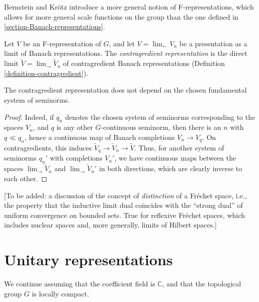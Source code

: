 \begin{remark}
\label{remark-generalscalefunctions}
 Bernstein and Kr\"otz introduce a more general notion of F-representations, which allows for more general scale functions on the group than the one defined in \ref{section-Banach-representations}.
\end{remark}

\begin{definition}
 \label{definition-contragredient-F}
Let $V$ be an F-representation of $G$, and let $V= \lim_\leftarrow V_n$ be a presentation as a limit of Banach representations. The {\it contragredient representation} is the direct limit $\tilde V= \lim_\to \tilde V_n$ of contragredient Banach representations (Definition \ref{definition-contragredient}).
\end{definition}

\begin{lemma}
 \label{lemma-contragredient-norm}
The contragredient representation does not depend on the chosen fundamental system of seminorms. 
\end{lemma}

\begin{proof}
 Indeed, if $q_n$ denotes the chosen system of seminorms corresponding to the spaces $V_n$, and $q$ is any other $G$-continuous seminorm, then there is an $n$ with $q\ll q_n$, hence a continuous map of Banach completions $V_n\to V_q$. On contragredients, this induces $\tilde V_q \to \tilde V_n \to \tilde V$. Thus, for another system of seminorms $q_n'$ with completions $V_n'$, we have continuous maps between the spaces $\lim_\to \tilde V_n$ and $\lim_\to \tilde V_n'$ in both directions, which are clearly inverse to each other.
\end{proof}

[To be added: a discussion of the concept of \emph{distinction} of a Fr\'echet space, i.e., the property that the inductive limit dual coincides with the ``strong dual'' of uniform convergence on bounded sets. True for reflexive Fr\'echet spaces, which includes nuclear spaces and, more generally, limits of Hilbert spaces.]


\section{Unitary representations}
\label{section-unitary-representations}

We continue assuming that the coefficient field is $\mathbb C$, and that the topological group $G$ is locally compact.


